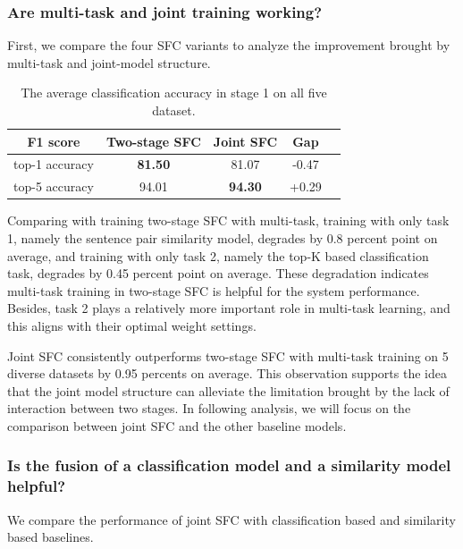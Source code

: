 \documentclass[letterpaper]{article} %
\providecommand{\tabularnewline}{\\}
\begin{document}
  \subsubsection*{Are multi-task and joint training working?} 
  First, we compare the four  SFC  variants to analyze the improvement
  brought  by  multi-task  and  joint-model  structure. 

  \begin{table}
    \begin{centering}
      \begin{tabular}{|c|c|c|c|c|}
        \hline
        F1 score & Two-stage SFC & Joint SFC & Gap & \tabularnewline
        \hline
        top-1 accuracy  & \textbf{81.50} & 81.07 & -0.47 & \tabularnewline
        top-5 accuracy & 94.01 & \textbf{94.30} & +0.29 & \tabularnewline
        \hline
      \end{tabular}
      \par
    \end{centering}
    \caption{The average classification accuracy in stage 1 on all five dataset.}
    \label{tbe:top1_5_accuracy}
  \end{table}

  Comparing with training two-stage SFC with multi-task, training with only task
  1,  namely the sentence pair similarity model, degrades by 0.8 percent
  point  on average, and training with only task 2, namely the top-K based
  classification  task,  degrades  by  0.45  percent  point  on  average.  These
  degradation  indicates  multi-task training in two-stage SFC is helpful for the
  system  performance.  Besides, task 2 plays a relatively more important role in
  multi-task learning, and this aligns with their optimal weight settings.

  Joint SFC consistently outperforms two-stage SFC with multi-task training  
  on 5 diverse datasets by 0.95 percents  on  average. 
  This observation supports the idea that the joint model
  structure  can  alleviate  the  limitation  brought by the lack of interaction
  between  two  stages.  In  following analysis, we will focus on the comparison
  between joint SFC and the other baseline models.

  \subsubsection*{Is  the  fusion of a classification model and a similarity model
  helpful?}  We  compare  the performance of joint SFC with classification based
  and similarity based baselines.
\end{document}
